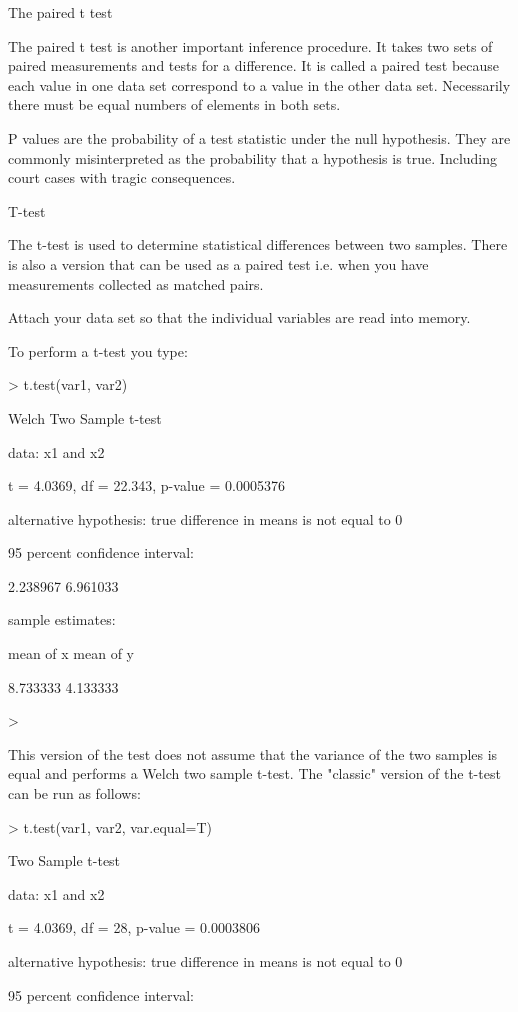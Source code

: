The paired t test 

The paired t test is another important inference procedure. It takes two sets of paired measurements and tests for a difference. It is called a paired test because each value in one data set  correspond to a value in the other data set. Necessarily there must be equal numbers of elements in both sets.


P values are the probability of a test statistic under the null hypothesis. They are commonly misinterpreted as the probability that a hypothesis is true. Including court cases with tragic consequences.





T-test

The t-test is used to determine statistical differences between two samples. There is also a version that can be used as a paired test i.e. when you have measurements collected as matched pairs.


Attach your data set so that the individual variables are read into memory.

To perform a t-test you type:


> t.test(var1, var2)

Welch Two Sample t-test

data: x1 and x2

t = 4.0369, df = 22.343, p-value = 0.0005376

alternative hypothesis: true difference in means is not equal to 0

95 percent confidence interval:

2.238967 6.961033

sample estimates:

mean of x mean of y

8.733333 4.133333

>

This version of the test does not assume that the variance of the two samples is equal and performs a Welch two sample t-test. The "classic" version of the t-test can be run as follows:

> t.test(var1, var2, var.equal=T)

Two Sample t-test

data: x1 and x2

t = 4.0369, df = 28, p-value = 0.0003806

alternative hypothesis: true difference in means is not equal to 0

95 percent confidence interval:

